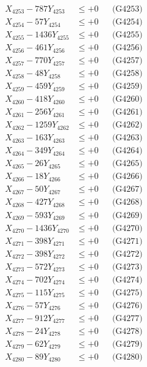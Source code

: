 \documentclass[a4paper,10pt]{article}
\begin{document}
{\begin{align}
X_{4253} - 787Y_{4253} &\leq +0 && \text{(G4253)} \\
X_{4254} - 57Y_{4254} &\leq +0 && \text{(G4254)} \\
X_{4255} - 1436Y_{4255} &\leq +0 && \text{(G4255)} \\
X_{4256} - 461Y_{4256} &\leq +0 && \text{(G4256)} \\
X_{4257} - 770Y_{4257} &\leq +0 && \text{(G4257)} \\
X_{4258} - 48Y_{4258} &\leq +0 && \text{(G4258)} \\
X_{4259} - 459Y_{4259} &\leq +0 && \text{(G4259)} \\
X_{4260} - 418Y_{4260} &\leq +0 && \text{(G4260)} \\
\allowbreak
X_{4261} - 256Y_{4261} &\leq +0 && \text{(G4261)} \\
X_{4262} - 1259Y_{4262} &\leq +0 && \text{(G4262)} \\
X_{4263} - 163Y_{4263} &\leq +0 && \text{(G4263)} \\
X_{4264} - 349Y_{4264} &\leq +0 && \text{(G4264)} \\
X_{4265} - 26Y_{4265} &\leq +0 && \text{(G4265)} \\
X_{4266} - 18Y_{4266} &\leq +0 && \text{(G4266)} \\
X_{4267} - 50Y_{4267} &\leq +0 && \text{(G4267)} \\
X_{4268} - 427Y_{4268} &\leq +0 && \text{(G4268)} \\
X_{4269} - 593Y_{4269} &\leq +0 && \text{(G4269)} \\
X_{4270} - 1436Y_{4270} &\leq +0 && \text{(G4270)} \\
\allowbreak
X_{4271} - 398Y_{4271} &\leq +0 && \text{(G4271)} \\
X_{4272} - 398Y_{4272} &\leq +0 && \text{(G4272)} \\
X_{4273} - 572Y_{4273} &\leq +0 && \text{(G4273)} \\
X_{4274} - 702Y_{4274} &\leq +0 && \text{(G4274)} \\
X_{4275} - 115Y_{4275} &\leq +0 && \text{(G4275)} \\
X_{4276} - 57Y_{4276} &\leq +0 && \text{(G4276)} \\
X_{4277} - 912Y_{4277} &\leq +0 && \text{(G4277)} \\
X_{4278} - 24Y_{4278} &\leq +0 && \text{(G4278)} \\
X_{4279} - 62Y_{4279} &\leq +0 && \text{(G4279)} \\
X_{4280} - 89Y_{4280} &\leq +0 && \text{(G4280)} \\

\end{align}}
\end{document}
